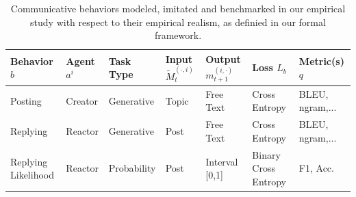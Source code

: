 \begin{table}[ht]
	\centering
    \small
	\begin{tabular}{l | llllll}
		\toprule
		Behavior $b$ & 
        Agent $a^i$  & 
        Task Type & 
        Input $\widetilde{M}_{t}^{(\cdot, i)}$ & 
        Output $m_{t+1}^{(i,\cdot)}$ & 
        Loss $L_b$ &
        Metric(s) $q$ \\
		\midrule
		Posting & Creator & Generative  & Topic  & Free Text & Cross Entropy & BLEU, ngram,... \\
		Replying & Reactor & Generative  & Post   & Free Text & Cross Entropy & BLEU, ngram,... \\
		Replying Likelihood & Reactor & Probability & Post & Interval [0,1] & Binary Cross Entropy & F1, Acc. \\
		\bottomrule
	\end{tabular}
    \vspace{0.1cm}
	\\
	\caption{Communicative behaviors modeled, imitated and benchmarked in our empirical study with respect to their empirical realism, as definied in our formal framework.}
	\label{tab:methods:task}
\end{table}